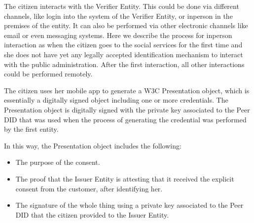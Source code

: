 \documentclass[a4paper,12pt,english,openany]{sphinxmanual}
\begin{document}
\sphinxAtStartPar
The citizen interacts with the Verifier Entity. This could be done via different channels, like login into the system of the Verifier Entity, or in\sphinxhyphen{}person in the premises of the entity. It can also be performed via other electronic channels like email or even messaging systems. Here we describe the process for in\sphinxhyphen{}person interaction as when the citizen goes to the social services for the first time and she does not have yet any legally accepted identification mechanism to interact with the public administration. After the first interaction, all other interactions could be performed remotely.

\sphinxAtStartPar
The citizen uses her mobile app to generate a W3C Presentation object, which is essentially a digitally signed object including one or more credentials. The Presentation object is digitally signed with the private key associated to the Peer DID that was used when the process of generating the credential was performed by the first entity.

\sphinxAtStartPar
In this way, the Presentation object includes the following:
\begin{itemize}
\item {} 
\sphinxAtStartPar
The purpose of the consent.

\item {} 
\sphinxAtStartPar
The proof that the Issuer Entity is attesting that it received the explicit consent from the customer, after identifying her.

\item {} 
\sphinxAtStartPar
The signature of the whole thing using a private key associated to the Peer DID that the citizen provided to the Issuer Entity.

\end{itemize}



\renewcommand{\indexname}{Index}
\printindex
\end{document}
